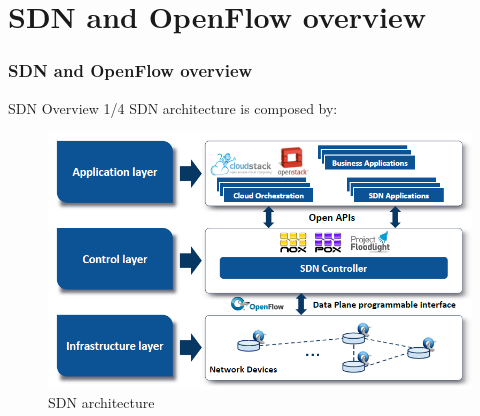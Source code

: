 \section{SDN and OpenFlow overview}
\frame
{
\frametitle{SDN and OpenFlow overview}
\tableofcontents[currentsection]
\addtocounter{framenumber}{-1}
}

\begin{frame}{SDN Overview \small{1/4}}
SDN architecture is composed by:
\begin{figure}
\includegraphics[scale=0.45]{Immagini/SDNStructure.png}
\caption{SDN architecture}
\label{fig:SDN-architecture}
\end{figure}
\end{frame}


